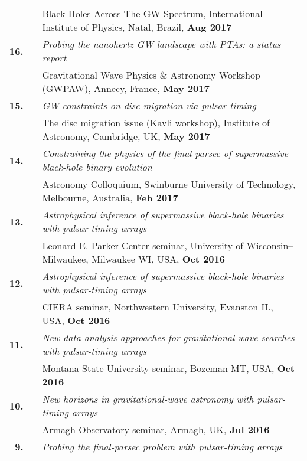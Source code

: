 \documentclass[11pt,letterpaper,sans]{moderncv}
\begin{document}
{\begin{longtable}{rp{0.3cm}p{15.8cm}}
&& Black Holes Across The GW Spectrum, International Institute of Physics, Natal, Brazil, \textbf{Aug 2017} \vspace{0.09cm}\\
\textbf{16.} & & \textit{Probing the nanohertz GW landscape with PTAs: a status report} \\
&& Gravitational Wave Physics \& Astronomy Workshop (GWPAW), Annecy, France, \textbf{May 2017} \vspace{0.09cm}\\
\textbf{15.} & & \textit{GW constraints on disc migration via pulsar timing} \\
&& The disc migration issue (Kavli workshop), Institute of Astronomy, Cambridge, UK, \textbf{May 2017} \vspace{0.09cm}\\
\textbf{14.} & & \textit{Constraining the physics of the final parsec of supermassive black-hole binary evolution} \\ 
&& Astronomy Colloquium, Swinburne University of Technology, Melbourne, Australia, \textbf{Feb 2017} \vspace{0.09cm}\\
\textbf{13.} & & \textit{Astrophysical inference of supermassive black-hole binaries with pulsar-timing arrays} \\ 
&& Leonard E. Parker Center seminar, University of Wisconsin--Milwaukee, Milwaukee WI, USA, \textbf{Oct 2016} \vspace{0.09cm}\\
\textbf{12.} & & \textit{Astrophysical inference of supermassive black-hole binaries with pulsar-timing arrays} \\ 
&& CIERA seminar, Northwestern University, Evanston IL, USA, \textbf{Oct 2016} \vspace{0.09cm}\\
\textbf{11.} & & \textit{New data-analysis approaches for gravitational-wave searches with pulsar-timing arrays} \\ 
&& Montana State University seminar, Bozeman MT, USA, \textbf{Oct 2016} \vspace{0.09cm}\\
\textbf{10.} & & \textit{New horizons in gravitational-wave astronomy with pulsar-timing arrays} \\ 
&& Armagh Observatory seminar, Armagh, UK, \textbf{Jul 2016} \vspace{0.09cm}\\
\textbf{9.} & & \textit{Probing the final-parsec problem with pulsar-timing arrays} \\ 

\end{longtable}}
\end{document}
